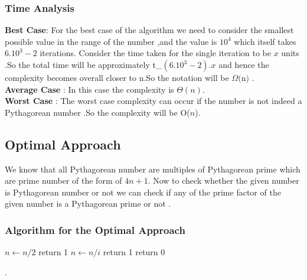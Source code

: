 \documentclass[twocolumn]{article}      %
\begin{document}
\subsubsection{Time Analysis}
\textbf{Best Case}: For the best case of the algorithm we need to consider the smallest possible value in the range of the number ,and the value is ${10^4}$ which itself takes ${6.10^3-2}$ iterations. Consider the time taken for the single iteration to be ${x}$ units .So the total time will be approximately t_\omega \propto  ${(6.10^3-2)}.x$ and hence the complexity becomes overall closer to n.So the notation will be $\Omega(${n}$)$ .\\
\textbf{Average Case} : In this case the complexity is $\Theta(n)$.\\
\textbf{Worst Case} : The worst case complexity can occur if the number is not indeed a Pythagorean number .So  the complexity will be O(${n}$).\\
\subsection{Optimal Approach}
We know that all Pythagorean number are multiples of Pythagorean prime which are prime number of the form of ${4n+1}$. Now to check whether the given number is Pythagorean number or not we can check if any of the prime factor of the given number is a Pythagorean prime or not . 
\newpage
\subsubsection{Algorithm for the Optimal Approach}
\begin{algorithm}
\begin{algorithmic}[1]
\State $n \gets n/2$
\EndWhile
{}
\State return 1
\EndIf
{}
\State $n \gets n/i$
\EndWhile
\EndFor
{}
\State return 1
\EndIf
\State return 0
\EndProcedure
\end{algorithmic}
\end{algorithm}.
\end{document}
